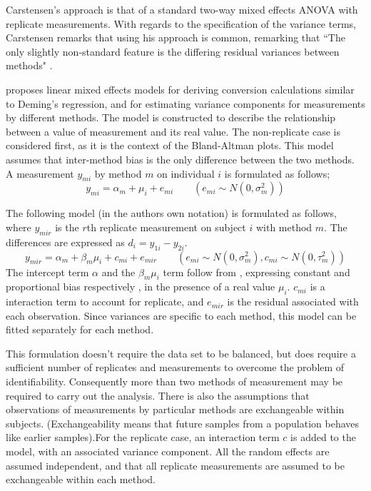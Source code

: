 \documentclass[12pt, a4paper]{report}
\theoremstyle{plain}
\theoremstyle{definition}
\theoremstyle{remark}
\begin{document}
	Carstensen's approach is that of a standard two-way mixed effects ANOVA with replicate measurements. With regards to the specification of the variance terms, Carstensen remarks that using his approach is common, remarking that ``The only slightly non-standard feature is the differing residual variances between methods" \citep{BXC2010}.
	
	\citet{BXC2004} proposes linear mixed effects models for deriving
	conversion calculations similar to Deming's regression, and for
	estimating variance components for measurements by different
	methods. The model is constructed to
	describe the relationship between a value of measurement and its
	real value. The non-replicate case is considered first, as it is
	the context of the Bland-Altman plots. This model assumes that
	inter-method bias is the only difference between the two methods.
	A measurement $y_{mi}$ by method $m$ on individual $i$ is
	formulated as follows;
	\begin{equation}
	y_{mi}  = \alpha_{m} + \mu_{i} + e_{mi} \qquad ( e_{mi} \sim
	N(0,\sigma^{2}_{m}))
	\end{equation}
	
	The following model (in the authors own notation) is
	formulated as follows, where $y_{mir}$ is the $r$th replicate
	measurement on subject $i$ with method $m$. The differences are expressed as $d_{i} = y_{1i} - y_{2i}$.
	\begin{equation}
	y_{mir}  = \alpha_{m} + \beta_{m}\mu_{i} + c_{mi} + e_{mir} \qquad
	( e_{mi} \sim N(0,\sigma^{2}_{m}), c_{mi} \sim N(0,\tau^{2}_{m}))
	\end{equation}
	The intercept term $\alpha$ and the $\beta_{m}\mu_{i}$ term follow
	from \citet{DunnSEME}, expressing constant and proportional bias
	respectively , in the presence of a real value $\mu_{i}.$
	$c_{mi}$ is a interaction term to account for replicate, and
	$e_{mir}$ is the residual associated with each observation.
	Since variances are specific to each method, this model can be
	fitted separately for each method.
	
	
	This formulation doesn't require the data set to be balanced, but does require a sufficient number of replicates
	and measurements to overcome the problem of identifiability. Consequently more than two methods of measurement may
	be required to carry out the analysis. There is also the assumptions that observations of measurements by particular methods are exchangeable within subjects. (Exchangeability means that future samples from a population behaves like earlier
	samples).For the replicate case, an interaction term $c$ is added to the model, with an associated variance component. All the random effects are assumed independent, and that all replicate measurements are assumed to be exchangeable within each method. 
	
\end{document}
